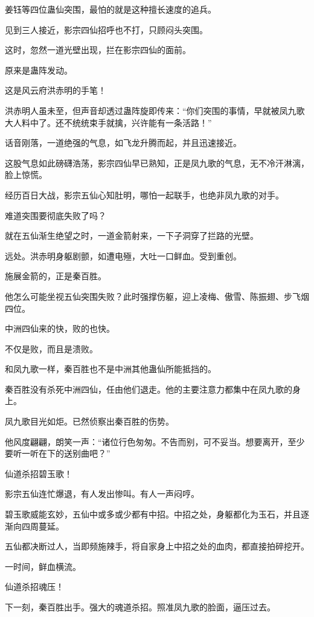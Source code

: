 \begin{this_body}
姜钰等四位蛊仙突围，最怕的就是这种擅长速度的追兵。

见到三人接近，影宗四仙招呼也不打，只顾闷头突围。

这时，忽然一道光壁出现，拦在影宗四仙的面前。

原来是蛊阵发动。

这是风云府洪赤明的手笔！

洪赤明人虽未至，但声音却透过蛊阵旋即传来：“你们突围的事情，早就被凤九歌大人料中了。还不统统束手就擒，兴许能有一条活路！”

话音刚落，一道绝强的气息，如飞龙升腾而起，并且迅速接近。

这股气息如此磅礴浩荡，影宗四仙早已熟知，正是凤九歌的气息，无不冷汗淋漓，脸上惊慌。

经历百日大战，影宗五仙心知肚明，哪怕一起联手，也绝非凤九歌的对手。

难道突围要彻底失败了吗？

就在五仙渐生绝望之时，一道金箭射来，一下子洞穿了拦路的光壁。

远处。洪赤明身躯剧颤，如遭电殛，大吐一口鲜血。受到重创。

施展金箭的，正是秦百胜。

他怎么可能坐视五仙突围失败？此时强撑伤躯，迎上凌梅、傲雪、陈振翅、步飞烟四位。

中洲四仙来的快，败的也快。

不仅是败，而且是溃败。

和凤九歌一样，秦百胜也不是中洲其他蛊仙所能抵挡的。

秦百胜没有杀死中洲四仙，任由他们退走。他的主要注意力都集中在凤九歌的身上。

凤九歌目光如炬。已然侦察出秦百胜的伤势。

他风度翩翩，朗笑一声：“诸位行色匆匆。不告而别，可不妥当。想要离开，至少要听一听在下的送别曲吧？”

仙道杀招碧玉歌！

影宗五仙连忙爆退，有人发出惨叫。有人一声闷哼。

碧玉歌威能玄妙，五仙中或多或少都有中招。中招之处，身躯都化为玉石，并且逐渐向四周蔓延。

五仙都决断过人，当即频施辣手，将自家身上中招之处的血肉，都直接拍碎挖开。

一时间，鲜血横流。

仙道杀招魂压！

下一刻，秦百胜出手。强大的魂道杀招。照准凤九歌的脸面，逼压过去。


\end{this_body}

